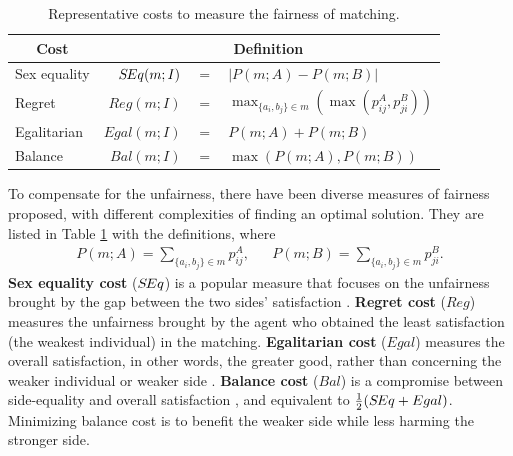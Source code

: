 \begin{table}[ht]
   \small
   \setlength\tabcolsep{4.0pt} %
    \centering
    \begin{tabular}{lrcl}
        \toprule
        \multicolumn{1}{c}{Cost} & \multicolumn{3}{c}{Definition} \\
        \midrule
        Sex equality  &  $S\hspace{-0.1em}Eq(m;I)$ & $\!=\!$  & $|P(m;A)-P(m;B)|$ \\
        Regret        &  $Reg(m;I)$ & $\!=\!$  & $\max_{\{a_i,b_j\}\in m}(\max(p^A_{ij},p^B_{ji}))$ \\
        Egalitarian   &  $Egal(m;I)$& $\!=\!$  & $P(m;A)+P(m;B) $ \\
        Balance       &  $Bal(m;I)$ & $\!=\!$  & $\max(P(m;A),P(m;B)) $  \\   \bottomrule
    \end{tabular}
    \caption{Representative costs to measure the fairness of matching.}
    \label{tab:costs}
\end{table}


To compensate for the unfairness, there have been diverse measures of fairness proposed, with different complexities of finding an optimal solution. They are listed in Table \ref{tab:costs} with the definitions, where
\begin{align}
    P(m;A) =\!\! \sum_{\{a_i,b_j\}\in m}\!\! p^A_{ij}, && P(m;B) =\!\! \sum_{\{a_i,b_j\}\in m}\!\! p^B_{ji}.  \label{eq:pref} 
\end{align}
\textbf{Sex equality cost} ($S\hspace{-0.1em}Eq$) is a popular measure that focuses on the unfairness brought by the gap between the two sides' satisfaction \cite{gusfield1989stable}. 
\textbf{Regret cost} ($Reg$) measures the unfairness brought by the agent who obtained the least satisfaction (the weakest individual) in the matching.
\textbf{Egalitarian cost} ($Egal$) measures the overall satisfaction, in other words, the greater good, rather than concerning the weaker individual or weaker side \cite{gusfield1989stable}.
\textbf{Balance cost} ($Bal$) is a compromise between side-equality and overall satisfaction \cite{feder1995stable,gupta2019balanced}, and equivalent to $\frac{1}{2}(S\hspace{-0.1em}Eq+Egal)$. 
Minimizing balance cost is to benefit the weaker side while less harming the stronger side. 

